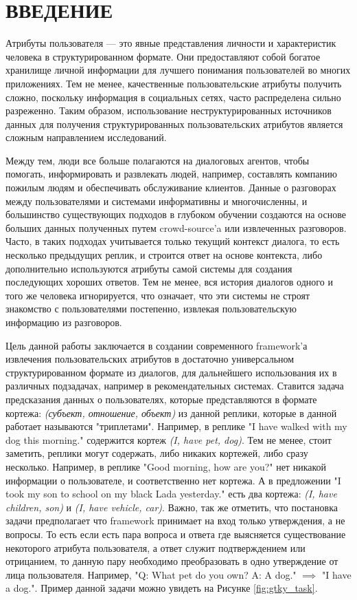 \chapter{\centering\normalsize{ВВЕДЕНИЕ}}

 Атрибуты пользователя — это явные представления личности и характеристик человека в структурированном формате. Они предоставляют собой богатое хранилище личной информации для лучшего понимания пользователей во многих приложениях. Тем не менее, качественные пользовательские атрибуты получить сложно, поскольку информация в социальных сетях, часто распределена сильно разреженно. Таким образом, использование неструктурированных источников данных для получения структурированных пользовательских атрибутов является сложным направлением исследований.

 Между тем, люди все больше полагаются на диалоговых агентов, чтобы помогать, информировать и развлекать людей, например, составлять компанию пожилым людям и обеспечивать обслуживание клиентов. Данные о разговорах между пользователями и системами информативны и многочисленны, и большинство существующих подходов в глубоком обучении создаются на основе больших данных полученных путем crowd-source'a или извлеченных разговоров. Часто, в таких подходах учитывается только текущий контекст диалога, то есть несколько предыдущих реплик, и строится ответ на основе контекста, либо дополнительно используются атрибуты самой системы для создания последующих хороших ответов. Тем не менее, вся история диалогов одного и того же человека игнорируется, что означает, что эти системы не строят знакомство с пользователями постепенно, извлекая пользовательскую информацию из разговоров.

 Цель данной работы заключается в создании современного framework'а извлечения пользовательских атрибутов в достаточно универсальном структурированном формате из диалогов, для дальнейшего использования их в различных подзадачах, например в рекомендательных системах. Ставится задача предсказания данных о пользователях, которые представляются в формате кортежа: \emph{(субъект, отношение, объект)} из данной реплики, которые в данной работает называются "триплетами". Например, в реплике "I have walked with my dog this morning." содержится кортеж \emph{(I, have pet, dog)}. Тем не менее, стоит заметить, реплики могут содержать, либо никаких кортежей, либо сразу несколько. Например, в реплике "Good morning, how are you?" нет никакой информации о пользователе, и соответственно нет кортежа. А в предложении "I took my son to school on my black Lada yesterday." есть два кортежа: \emph{(I, have children, son)} и \emph{(I, have vehicle, car)}. Важно, так же отметить, что постановка задачи предполагает что framework принимает на вход только утверждения, а не вопросы. То есть если есть пара вопроса и ответа где выясняется существование некоторого атрибута пользователя, а ответ служит подтверждением или отрицанием, то данную пару необходимо преобразовать в одно утверждение от лица пользователя. Например, "Q: What pet do you own? A: A dog." $\implies$ "I have a dog.". Пример данной задачи можно увидеть на Рисунке \ref{fig:gtky_task}.

